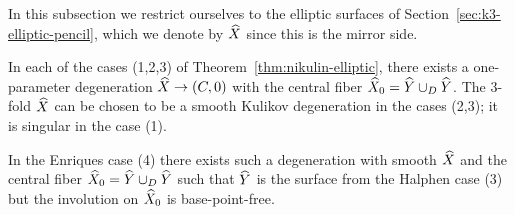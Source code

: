 \documentclass{amsart}
\begin{document}
In this subsection we restrict ourselves to the elliptic surfaces
of Section~\ref{sec:k3-elliptic-pencil}, which we denote by ${\widehat X}$ since
this is the mirror side.

\begin{lemma}\label{lem:special-degeneration}
  In each of the cases (1,2,3) of Theorem~\ref{thm:nikulin-elliptic},
  there exists a one-parameter degeneration ${\widehat X}\to (C,0)$ with the
  central fiber ${\widehat X}_0 = {\widehat Y}\cup_D {\widehat Y}$. The $3$-fold ${\widehat X}$ can be chosen to be
  a smooth Kulikov degeneration in the cases (2,3); it is singular in
  the case (1).
  
  In the Enriques case (4) there exists such a degeneration with
  smooth ${\widehat X}$ and the central fiber ${\widehat X}_0= {\widehat Y}\cup_D {\widehat Y}$ such that ${\widehat Y}$ is
  the surface from the Halphen case (3) but the involution on ${\widehat X}_0$ is
  base-point-free.
\end{lemma}
\end{document}
